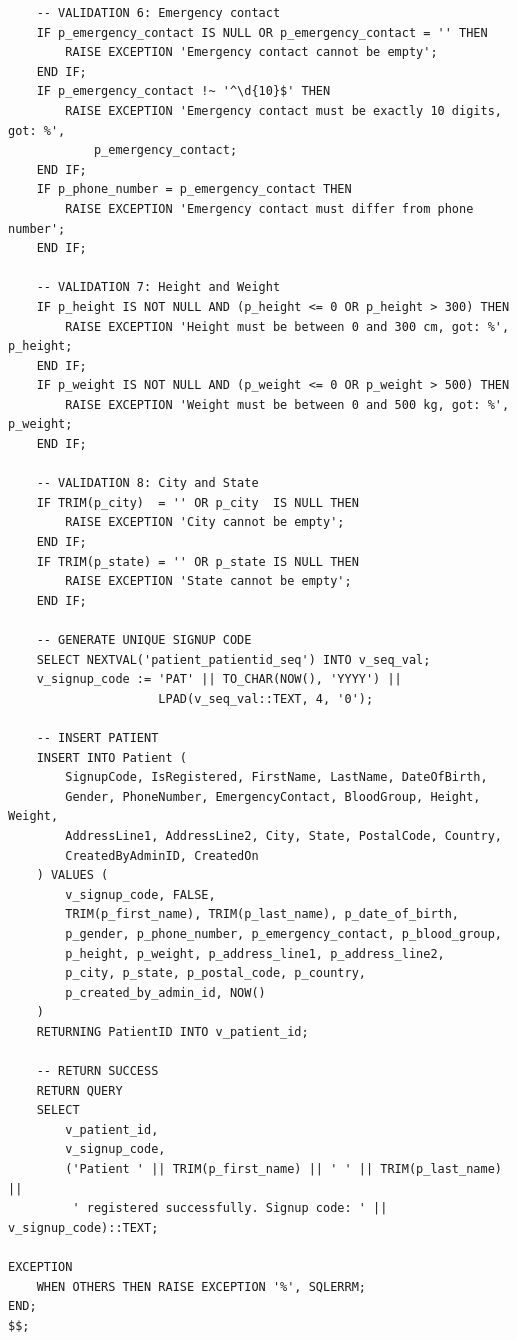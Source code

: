 \documentclass{article}
\begin{document}
\begin{lstlisting}
    -- VALIDATION 6: Emergency contact
    IF p_emergency_contact IS NULL OR p_emergency_contact = '' THEN
        RAISE EXCEPTION 'Emergency contact cannot be empty';
    END IF;
    IF p_emergency_contact !~ '^\d{10}$' THEN
        RAISE EXCEPTION 'Emergency contact must be exactly 10 digits, got: %',
            p_emergency_contact;
    END IF;
    IF p_phone_number = p_emergency_contact THEN
        RAISE EXCEPTION 'Emergency contact must differ from phone number';
    END IF;

    -- VALIDATION 7: Height and Weight
    IF p_height IS NOT NULL AND (p_height <= 0 OR p_height > 300) THEN
        RAISE EXCEPTION 'Height must be between 0 and 300 cm, got: %', p_height;
    END IF;
    IF p_weight IS NOT NULL AND (p_weight <= 0 OR p_weight > 500) THEN
        RAISE EXCEPTION 'Weight must be between 0 and 500 kg, got: %', p_weight;
    END IF;

    -- VALIDATION 8: City and State
    IF TRIM(p_city)  = '' OR p_city  IS NULL THEN
        RAISE EXCEPTION 'City cannot be empty';
    END IF;
    IF TRIM(p_state) = '' OR p_state IS NULL THEN
        RAISE EXCEPTION 'State cannot be empty';
    END IF;

    -- GENERATE UNIQUE SIGNUP CODE
    SELECT NEXTVAL('patient_patientid_seq') INTO v_seq_val;
    v_signup_code := 'PAT' || TO_CHAR(NOW(), 'YYYY') ||
                     LPAD(v_seq_val::TEXT, 4, '0');

    -- INSERT PATIENT
    INSERT INTO Patient (
        SignupCode, IsRegistered, FirstName, LastName, DateOfBirth,
        Gender, PhoneNumber, EmergencyContact, BloodGroup, Height, Weight,
        AddressLine1, AddressLine2, City, State, PostalCode, Country,
        CreatedByAdminID, CreatedOn
    ) VALUES (
        v_signup_code, FALSE,
        TRIM(p_first_name), TRIM(p_last_name), p_date_of_birth,
        p_gender, p_phone_number, p_emergency_contact, p_blood_group,
        p_height, p_weight, p_address_line1, p_address_line2,
        p_city, p_state, p_postal_code, p_country,
        p_created_by_admin_id, NOW()
    )
    RETURNING PatientID INTO v_patient_id;

    -- RETURN SUCCESS
    RETURN QUERY
    SELECT
        v_patient_id,
        v_signup_code,
        ('Patient ' || TRIM(p_first_name) || ' ' || TRIM(p_last_name) ||
         ' registered successfully. Signup code: ' || v_signup_code)::TEXT;

EXCEPTION
    WHEN OTHERS THEN RAISE EXCEPTION '%', SQLERRM;
END;
$$;
\end{lstlisting}
\end{document}

